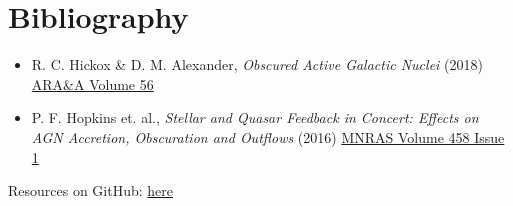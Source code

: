 	\section{Bibliography}

	\begin{frame}
		\begin{center}\textcolor{MASS}{}\end{center}\vspace{2ex}
		\begin{itemize}
			\item R. C. Hickox \& D. M. Alexander, {\itshape{Obscured Active Galactic Nuclei}} (2018)
				  \href{https://www.annualreviews.org/content/journals/10.1146/annurev-astro-081817-051803}{ARA\&A Volume 56}
			\item P. F. Hopkins et. al., {\itshape{Stellar and Quasar Feedback in Concert: Effects on AGN Accretion, Obscuration and Outflows}} (2016)
				  \href{https://academic.oup.com/mnras/article/458/1/816/2622540}{MNRAS Volume 458 Issue 1}
		\end{itemize}
		\vspace{2ex}
		Resources on GitHub: \href{https://github.com/fritzali/notes/tree/main/MASS/Active/presentation/NSD}{here}
	\end{frame}

